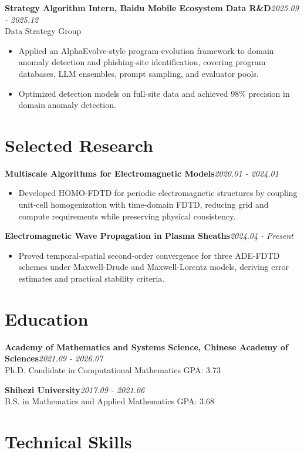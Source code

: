 \documentclass[10pt,letterpaper]{article}
\newcommand{\entry}[3]{%
  \textbf{#1}\hfill{\color{muted}\textit{#2}}\\[-0.22em]
  {\color{muted}\small #3}\par
}
\newcommand{\project}[2]{%
  \textbf{#1}\hfill{\color{muted}\textit{#2}}\par
}
\begin{document}
\entry{Strategy Algorithm Intern, Baidu Mobile Ecosystem Data R\&D}{2025.09 - 2025.12}{Data Strategy Group}
\begin{itemize}
  \item Applied an AlphaEvolve-style program-evolution framework to domain anomaly detection and phishing-site identification, covering program databases, LLM ensembles, prompt sampling, and evaluator pools.
  \item Optimized detection models on full-site data and achieved 98\% precision in domain anomaly detection.
\end{itemize}

\section{Selected Research}

\project{Multiscale Algorithms for Electromagnetic Models}{2020.01 - 2024.01}
\begin{itemize}
  \item Developed HOMO-FDTD for periodic electromagnetic structures by coupling unit-cell homogenization with time-domain FDTD, reducing grid and compute requirements while preserving physical consistency.
\end{itemize}

\project{Electromagnetic Wave Propagation in Plasma Sheaths}{2024.04 - Present}
\begin{itemize}
  \item Proved temporal-spatial second-order convergence for three ADE-FDTD schemes under Maxwell-Drude and Maxwell-Lorentz models, deriving error estimates and practical stability criteria.
\end{itemize}

\section{Education}

\entry{Academy of Mathematics and Systems Science, Chinese Academy of Sciences}{2021.09 - 2026.07}{Ph.D. Candidate in Computational Mathematics \textbar{} GPA: 3.73}
\vspace{0.10em}
\entry{Shihezi University}{2017.09 - 2021.06}{B.S. in Mathematics and Applied Mathematics \textbar{} GPA: 3.68}

\section{Technical Skills}
\end{document}
